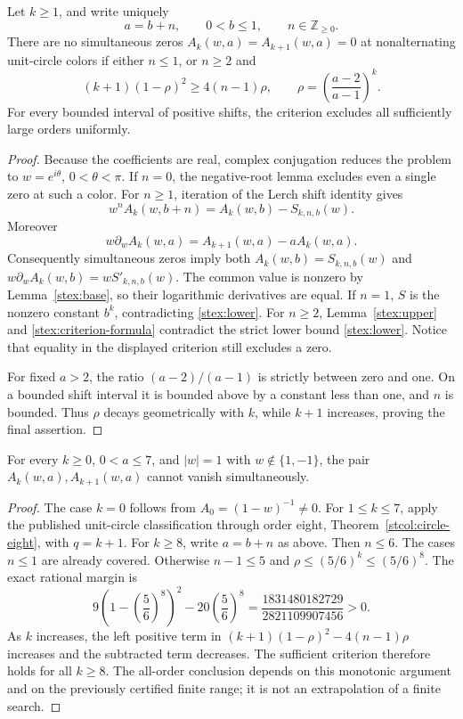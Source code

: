 \begin{theorem}
\label{stex:criterion}
Let $k\ge1$, and write uniquely
\[
 a=b+n,\qquad 0<b\le1,\qquad n\in\mathbb Z_{\ge0}.
\]
There are no simultaneous zeros $A_k(w,a)=A_{k+1}(w,a)=0$ at
nonalternating unit-circle colors if either $n\le1$, or $n\ge2$ and
\begin{equation}\label{stex:criterion-formula}
 (k+1)(1-\rho)^2\ge4(n-1)\rho,
 \qquad
 \rho=\left(\frac{a-2}{a-1}\right)^k.
\end{equation}
For every bounded interval of positive shifts, the criterion excludes
all sufficiently large orders uniformly.
\end{theorem}
\begin{proof}
Because the coefficients are real, complex conjugation reduces the
problem to $w=e^{i\theta}$, $0<\theta<\pi$.  If $n=0$, the
negative-root lemma excludes even a single zero at such a color.
For $n\ge1$, iteration of the Lerch shift identity gives
\begin{equation}\label{stex:shift}
 w^nA_k(w,b+n)=A_k(w,b)-S_{k,n,b}(w).
\end{equation}
Moreover
\[
 w\partial_w A_k(w,a)=A_{k+1}(w,a)-aA_k(w,a).
\]
Consequently simultaneous zeros imply both
$A_k(w,b)=S_{k,n,b}(w)$ and
$w\partial_w A_k(w,b)=wS'_{k,n,b}(w)$.
The common value is nonzero by Lemma~\ref{stex:base}, so their
logarithmic derivatives are equal.  If $n=1$, $S$ is the nonzero
constant $b^k$, contradicting \eqref{stex:lower}.
For $n\ge2$, Lemma~\ref{stex:upper} and
\eqref{stex:criterion-formula} contradict the strict lower bound
\eqref{stex:lower}.  Notice that equality in the displayed criterion
still excludes a zero.

For fixed $a>2$, the ratio $(a-2)/(a-1)$ is strictly between zero and
one.  On a bounded shift interval it is bounded above by a constant
less than one, and $n$ is bounded.  Thus $\rho$ decays geometrically
with $k$, while $k+1$ increases, proving the final assertion.
\end{proof}

\begin{corollary}
\label{stex:seven}
For every $k\ge0$, $0<a\le7$, and $|w|=1$ with
$w\notin\{1,-1\}$, the pair $A_k(w,a),A_{k+1}(w,a)$ cannot
vanish simultaneously.
\end{corollary}
\begin{proof}
The case $k=0$ follows from $A_0=(1-w)^{-1}\ne0$.
For $1\le k\le7$, apply the published unit-circle classification
through order eight, Theorem~\ref{stcol:circle-eight}, with $q=k+1$.
For $k\ge8$, write $a=b+n$ as above.  Then $n\le6$.
The cases $n\le1$ are already covered.  Otherwise
$n-1\le5$ and $\rho\le(5/6)^k\le(5/6)^8$.
The exact rational margin is
\[
 9\left(1-\left(\frac56\right)^8\right)^2
       -20\left(\frac56\right)^8
   =\frac{1831480182729}{2821109907456}>0.
\]
As $k$ increases, the left positive term in
$(k+1)(1-\rho)^2-4(n-1)\rho$ increases and the subtracted term
decreases.  The sufficient criterion therefore holds for all $k\ge8$.
The all-order conclusion depends on this monotonic argument and on
the previously certified finite range; it is not an extrapolation
of a finite search.
\end{proof}


